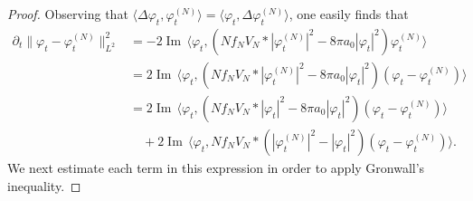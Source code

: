 \documentclass[11pt,a4paper]{scrartcl} %
\renewcommand{\Im}{\operatorname{Im}\,} 	%
\begin{document}
\begin{proof}
  Observing that $\langle \Delta \varphi_t, \varphi_t^{(N)} \rangle = \langle
  \varphi_t, \Delta \varphi_t^{(N)} \rangle$, one easily finds that
  \begin{equation}
    \label{ddt}
    \begin{aligned}
      \partial_t \| \varphi_t - \varphi_t^{(N)} \|_{L^2}^2 & = -2 \Im \langle
      \varphi_t, (N f_N V_N * |\varphi_t^{(N)}|^2 - 8 \pi a_0 |\varphi_t|^2)
      \varphi_t^{(N)} \rangle \\
      & = 2 \Im \langle \varphi_t, (N f_N V_N * |\varphi_t^{(N)}|^2 - 8 \pi
      a_0 |\varphi_t|^2) (\varphi_t - \varphi_t^{(N)}) \rangle \\
      & = 2 \Im \langle \varphi_t, (N f_N V_N * |\varphi_t|^2 - 8 \pi a_0
      |\varphi_t|^2) (\varphi_t - \varphi_t^{(N)}) \rangle \\
      & \quad + 2 \Im \langle \varphi_t, N f_N V_N * (|\varphi_t^{(N)}|^2 -
      |\varphi_t|^2) (\varphi_t - \varphi_t^{(N)}) \rangle.
    \end{aligned}
  \end{equation}
  We next estimate each term in this expression in order to apply Gronwall's
  inequality.



\end{proof}
\end{document}
